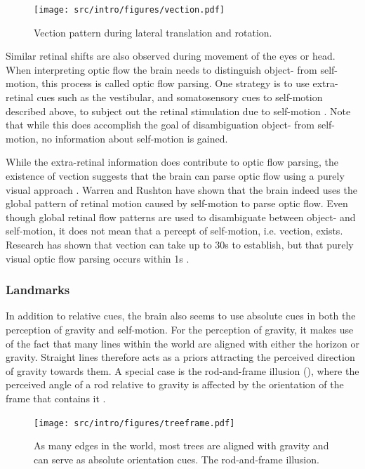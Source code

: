 \begin{figure}
    \texttt{[image: src/intro/figures/vection.pdf]}

    \caption{Vection pattern during  lateral translation and  rotation.}
    \label{intro:fig2}
\end{figure}

Similar retinal shifts are also observed during movement of the eyes or head. When interpreting optic flow the brain needs to distinguish object- from self-motion, this process is called optic flow parsing. One strategy is to use extra-retinal cues such as the vestibular, and somatosensory cues to self-motion described above, to subject out the retinal stimulation due to self-motion \cite{wertheim1994,wexler2001,macneilage2012}. Note that while this does accomplish the goal of disambiguation object- from self-motion, no information about self-motion is gained.

While the extra-retinal information does contribute to optic flow parsing, the existence of vection \cite{dichgans1978} suggests that the brain can parse optic flow using a purely visual approach \cite{rushton2005,warren2007}. Warren and Rushton \citeyear{warren2009} have shown that the brain indeed uses the global pattern of retinal motion caused by self-motion to parse optic flow. Even though global retinal flow patterns are used to disambiguate between object- and self-motion, it does not mean that a percept of self-motion, i.e. vection, exists. Research has shown that vection can take up to 30s to establish, but that purely visual optic flow parsing occurs within 1s \cite{warren2009}.

\subsubsection{Landmarks}
In addition to relative cues, the brain also seems to use absolute cues in both the perception of gravity and self-motion. For the perception of gravity, it makes use of the fact that many lines within the world are aligned with either the horizon or gravity. Straight lines therefore acts as a priors attracting the perceived direction of gravity towards them. A special case is the rod-and-frame illusion (), where the perceived angle of a rod relative to gravity is affected by the orientation of the frame that contains it \cite{witkin1948}. 

\begin{figure}
	\texttt{[image: src/intro/figures/treeframe.pdf]}
	\caption{ As many edges in the world, most trees are aligned with gravity and can serve as absolute orientation cues.   The rod-and-frame illusion.}
	\label{intro:fig9}
\end{figure}

